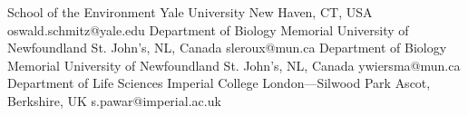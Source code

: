

\cvdoublecolumn
{
  {School of the Environment}
  {Yale University}
  {New Haven, CT, USA}
  {oswald.schmitz@yale.edu}
}
{
  {Department of Biology}
  {Memorial University of Newfoundland}
  {St. John's, NL, Canada}
  {sleroux@mun.ca}
}
{
  {Department of Biology}
  {Memorial University of Newfoundland}
  {St. John's, NL, Canada}
  {ywiersma@mun.ca}
}
{
  {Department of Life Sciences}
  {Imperial College London---Silwood Park}
  {Ascot, Berkshire, UK}
  {s.pawar@imperial.ac.uk}
}